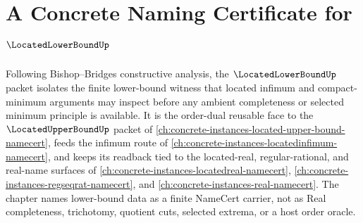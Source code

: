 \chapter{A Concrete Naming Certificate for $\LocatedLowerBoundUp$}
\label{ch:concrete-instances-located-lower-bound-namecert}

Following Bishop--Bridges constructive analysis, the $\LocatedLowerBoundUp$ packet isolates the finite lower-bound witness that located infimum and compact-minimum arguments may inspect before any ambient completeness or selected minimum principle is available. It is the order-dual reusable face to the $\LocatedUpperBoundUp$ packet of \autoref{ch:concrete-instances-located-upper-bound-namecert}, feeds the infimum route of \autoref{ch:concrete-instances-locatedinfimum-namecert}, and keeps its readback tied to the located-real, regular-rational, and real-name surfaces of \autoref{ch:concrete-instances-locatedreal-namecert}, \autoref{ch:concrete-instances-regseqrat-namecert}, and \autoref{ch:concrete-instances-real-namecert}. The chapter names lower-bound data as a finite NameCert carrier, not as Real completeness, trichotomy, quotient cuts, selected extrema, or a host order oracle.

